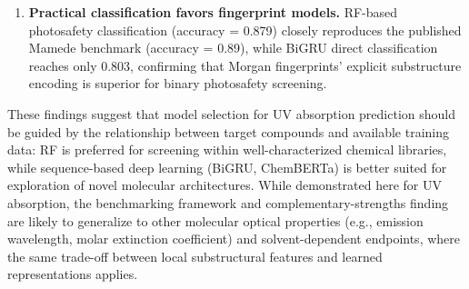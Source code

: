 \documentclass[11pt,a4paper]{article}
\begin{document}
\begin{enumerate}
    \item \textbf{Practical classification favors fingerprint models.}
    RF-based photosafety classification (accuracy = 0.879) closely reproduces the published Mamede benchmark (accuracy = 0.89), while BiGRU direct classification reaches only 0.803, confirming that Morgan fingerprints' explicit substructure encoding is superior for binary photosafety screening.
\end{enumerate}

These findings suggest that model selection for UV absorption prediction should be guided by the relationship between target compounds and available training data: RF is preferred for screening within well-characterized chemical libraries, while sequence-based deep learning (BiGRU, ChemBERTa) is better suited for exploration of novel molecular architectures.
While demonstrated here for UV absorption, the benchmarking framework and complementary-strengths finding are likely to generalize to other molecular optical properties (e.g., emission wavelength, molar extinction coefficient) and solvent-dependent endpoints, where the same trade-off between local substructural features and learned representations applies.
\end{document}

